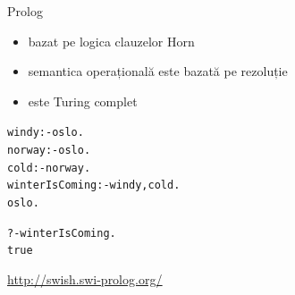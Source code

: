 \documentclass[xcolor=pdftex,romanian,colorlinks]{beamer}
\begin{document}
\begin{frame}{Prolog}

\vfill\begin{itemize}
	\item bazat pe logica clauzelor Horn
	\item semantica operațională este bazată pe rezoluție
	\item este Turing complet
\end{itemize}

\vspace{-.4cm}
\begin{alltt}
windy :- oslo. \\
norway :- oslo. \\
cold :- norway. \\
winterIsComing :- windy, cold. \\
oslo. \\
\end{alltt}


\vspace{-.4cm}
\begin{alltt}
?- winterIsComing.\\
true
\end{alltt}

\underline{\url{http://swish.swi-prolog.org/}}
\end{frame}

%
%
%
%
\end{document}
